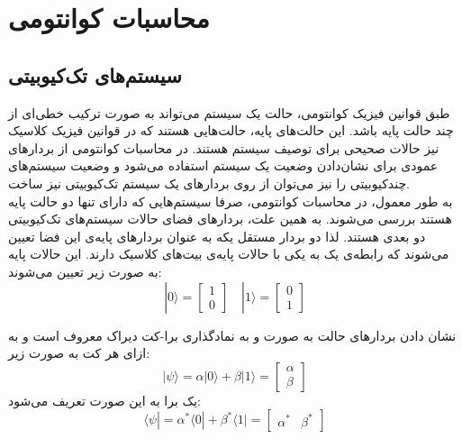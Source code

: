 

\section{محاسبات کوانتومی}

\subsection{سیستم‌های تک‌کیوبیتی}

طبق قوانین فیزیک کوانتومی، حالت یک سیستم می‌تواند به صورت ترکیب خطی‌ای از چند حالت پایه باشد. این حالت‌های پایه، حالت‌هایی هستند که در قوانین فیزیک کلاسیک نیز حالات صحیحی برای توصیف سیستم هستند.
در محاسبات کوانتومی از بردارهای عمودی برای نشان‌دادن وضعیت یک سیستم استفاده می‌شود و وضعیت سیستم‌های چندکیوبیتی را نیز می‌توان از روی بردارهای یک سیستم تک‌کیوبیتی نیز ساخت.
\\
به طور معمول، در محاسبات کوانتومی، صرفا سیستم‌هایی که دارای تنها دو حالت پایه هستند بررسی می‌شوند. به همین علت، بردارهای فضای حالات سیستم‌های تک‌کیوبیتی دو بعدی هستند. لذا دو بردار مستقل یکه به عنوان بردارهای پایه‌ی این فضا تعیین می‌شوند که رابطه‌ی یک به یکی با حالات پایه‌ی بیت‌های کلاسیک دارند.
این حالات پایه به صورت زیر تعیین می‌شوند:
\begin{equation}
    |0\rangle = \begin{bmatrix} 1 \\ 0 \end{bmatrix} 
    \mspace{18mu}
    |1\rangle = \begin{bmatrix} 0 \\ 1 \end{bmatrix}
\end{equation} 

نشان دادن بردارهای حالت به صورت 
\lr{$|0\rangle$} و \lr{$|1\rangle$}
به نمادگذاری برا-کت دیراک معروف است و به ازای هر کت
به صورت زیر:
\begin{equation}
    |\psi\rangle = \alpha |0\rangle + \beta |1\rangle
    = \begin{bmatrix}
    \alpha \\[3pt]
    \beta
    \end{bmatrix}
\end{equation}
یک برا
به این صورت تعریف می‌شود:
\begin{equation}
    \langle \psi| = \alpha^* \langle0| + \beta^* \langle1| = \begin{bmatrix} \alpha^* & \beta^* \end{bmatrix} 
\end{equation}

